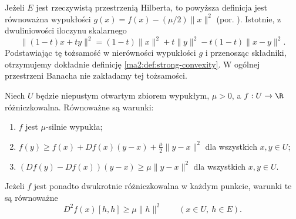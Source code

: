Jeżeli $E$ jest rzeczywistą przestrzenią Hilberta,
to powyższa definicja jest równoważna wypukłości
$g(x)=f(x)-(\mu/2)\|x\|^2$ (por.
).
Istotnie, z dwuliniowości iloczynu skalarnego
\[
 \|(1-t)x+ty\|^2=(1-t)\|x\|^2+t\|y\|^2
                 -t(1-t)\|x-y\|^2.
\]
Podstawiając tę tożsamość w nierówności wypukłości $g$
i przenosząc składniki, otrzymujemy dokładnie
definicję \ref{ma2:def:strong-convexity}.
W ogólnej przestrzeni Banacha nie zakładamy tej tożsamości.

\begin{twierdzenie}
\label{ma2:thm:strong-convexity-criteria}
Niech $U$ będzie niepustym otwartym zbiorem wypukłym,
$\mu>0$, a $f:U\to\R$ różniczkowalna.
Równoważne są warunki:
\begin{enumerate}[label=(\alph*)]
\item $f$ jest $\mu$-silnie wypukła;
\item $f(y)\ge f(x)+Df(x)(y-x)+\frac{\mu}{2}\|y-x\|^2$
dla wszystkich $x,y\in U$;
\item $(Df(y)-Df(x))(y-x)\ge\mu\|y-x\|^2$
dla wszystkich $x,y\in U$.
\end{enumerate}
Jeżeli $f$ jest ponadto dwukrotnie różniczkowalna
w każdym punkcie, warunki te są równoważne
\[
 D^2f(x)[h,h]\ge\mu\|h\|^2\qquad(x\in U,\ h\in E).
\]
\end{twierdzenie}
